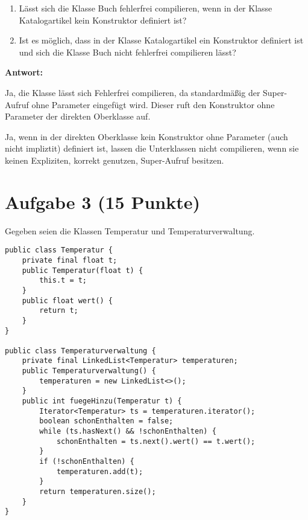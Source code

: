 \begin{enumerate}
    \item Lässt sich die Klasse Buch fehlerfrei compilieren, wenn in der Klasse
          Katalogartikel kein Konstruktor definiert ist?
    \item Ist es möglich, dass in der Klasse Katalogartikel ein Konstruktor definiert ist
          und sich die Klasse Buch nicht fehlerfrei compilieren lässt?
\end{enumerate}

\textbf{Antwort:}

Ja, die Klasse lässt sich Fehlerfrei compilieren, da standardmäßig der
Super-Aufruf ohne Parameter eingefügt wird. Dieser ruft den Konstruktor ohne
Parameter der direkten Oberklasse auf.

Ja, wenn in der direkten Oberklasse kein Konstruktor ohne Parameter (auch nicht
impliztit) definiert ist, lassen die Unterklassen nicht compilieren, wenn sie
keinen Expliziten, korrekt genutzen, Super-Aufruf besitzen.

\section{Aufgabe 3 (15 Punkte)}

Gegeben seien die Klassen Temperatur und Temperaturverwaltung.

\begin{lstlisting}
public class Temperatur {
    private final float t;
    public Temperatur(float t) {
        this.t = t;
    }
    public float wert() {
        return t;
    }
}

public class Temperaturverwaltung {
    private final LinkedList<Temperatur> temperaturen;
    public Temperaturverwaltung() {
        temperaturen = new LinkedList<>();
    }
    public int fuegeHinzu(Temperatur t) {
        Iterator<Temperatur> ts = temperaturen.iterator();
        boolean schonEnthalten = false;
        while (ts.hasNext() && !schonEnthalten) {
            schonEnthalten = ts.next().wert() == t.wert();
        }
        if (!schonEnthalten) {
            temperaturen.add(t);
        }
        return temperaturen.size();
    }
}
\end{lstlisting}

